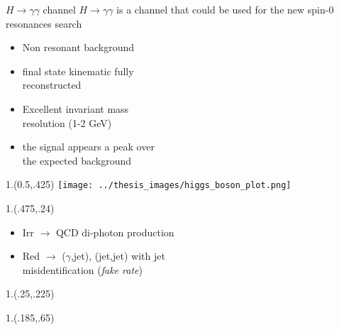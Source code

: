 \documentclass[10pt,UKenglish, leqno, xcolor = dvipsnames]{beamer}
\begin{document}
	\begin{frame}{$H\to\gamma\gamma$ channel}
		\vspace{.2cm}
		$H\to\gamma\gamma$ is a channel that could be used for the new spin-0 resonances search
		\begin{itemize}
			\item Non resonant background
			\vspace{1.5cm}
			\item final state kinematic fully\\ reconstructed
			\item Excellent invariant mass\\ resolution (1-2 GeV)
			\item the signal appears a peak over\\ the expected background
		\end{itemize}
		\vfill
		\begin{textblock}{1.}(0.5,.425)
			\texttt{[image: ../thesis\_images/higgs\_boson\_plot.png]}
		\end{textblock}
		\begin{textblock}{1.}(.475,.24)
			\begin{itemize}
				\footnotesize
				\item Irr $\to$ QCD di-photon production
				\vspace{.2cm}
				\item Red $\to$ ($\gamma$,jet), (jet,jet) with jet\\ misidentification (\textit{fake rate})
			\end{itemize}
		\end{textblock}
		\begin{textblock}{1.}(.25,.225)
		\end{textblock}
		\begin{textblock}{1.}(.185,.65)
		\end{textblock}
	\end{frame}
		
\end{document}

